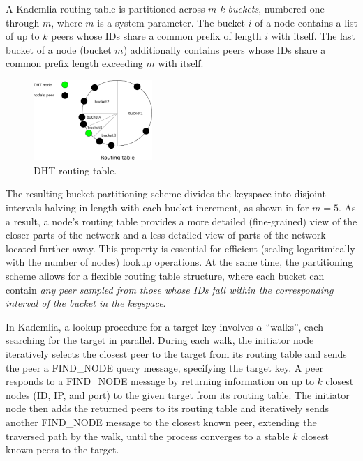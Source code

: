 A Kademlia routing table is partitioned across $m$ \textit{k-buckets}, numbered one through $m$, where $m$ is a system parameter. The bucket $i$ of a node contains a list of up to $k$ peers whose IDs share a common prefix of length $i$ with itself. The last bucket of a node (\ie bucket $m$) additionally contains peers whose IDs share a common prefix length exceeding $m$ with itself. %

\begin{figure}
    \includegraphics[width=0.4\textwidth]{img/kademlia}
    \caption{DHT routing table.}
    \label{fig:kademlia}
 \end{figure}

The resulting bucket partitioning scheme divides the keyspace into disjoint intervals halving in length with each bucket increment, as shown in  for $m=5$. As a result, a node's routing table provides a more detailed (\ie fine-grained) view of the closer parts of the network and a less detailed view of parts of the network located further away. This property is essential for efficient (\ie scaling logaritmically with the number of nodes) lookup operations. At the same time, the partitioning scheme allows for a flexible routing table structure, where each bucket can contain \textit{any peer sampled from those whose IDs fall within the corresponding interval of the bucket in the keyspace}.

In Kademlia, a lookup procedure for a target key involves $\alpha$ ``walks'', each searching for the target in parallel. During each walk, the initiator node iteratively selects the closest peer to the target from its routing table and sends the peer a FIND\_NODE query message, specifying the target key. A peer responds to a FIND\_NODE message by returning information on up to $k$ closest nodes (\ie ID, IP, and port) to the given target from its routing table. The initiator node then adds the returned peers to its routing table and iteratively sends another FIND\_NODE message to the closest known peer, extending the traversed path by the walk, until the process converges to a stable $k$ closest known peers to the target. %

